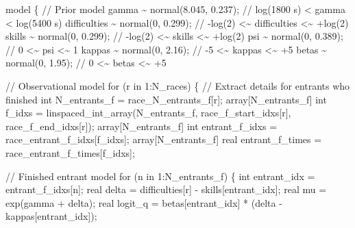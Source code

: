 \documentclass[
  letterpaper,
  DIV=11,
  numbers=noendperiod]{scrartcl}
\newenvironment{Shaded}{\begin{snugshade}}{\end{snugshade}}
\newcommand{\CommentTok}[1]{\textcolor[rgb]{0.37,0.37,0.37}{#1}}
\newcommand{\ControlFlowTok}[1]{\textcolor[rgb]{0.00,0.23,0.31}{#1}}
\newcommand{\DataTypeTok}[1]{\textcolor[rgb]{0.68,0.00,0.00}{#1}}
\newcommand{\DecValTok}[1]{\textcolor[rgb]{0.68,0.00,0.00}{#1}}
\newcommand{\FloatTok}[1]{\textcolor[rgb]{0.68,0.00,0.00}{#1}}
\newcommand{\KeywordTok}[1]{\textcolor[rgb]{0.00,0.23,0.31}{#1}}
\newcommand{\NormalTok}[1]{\textcolor[rgb]{0.00,0.23,0.31}{#1}}
\begin{document}
\begin{codelisting}
\begin{Shaded}
\begin{Highlighting}[]
\KeywordTok{model}\NormalTok{ \{}
  \CommentTok{// Prior model}
\NormalTok{  gamma \textasciitilde{} normal(}\FloatTok{8.045}\NormalTok{, }\FloatTok{0.237}\NormalTok{);    }\CommentTok{// log(1800 s) \textless{} gamma \textless{} log(5400 s)}
\NormalTok{  difficulties \textasciitilde{} normal(}\DecValTok{0}\NormalTok{, }\FloatTok{0.299}\NormalTok{); }\CommentTok{// {-}log(2) \textless{}\textasciitilde{} difficulties \textless{}\textasciitilde{} +log(2)}
\NormalTok{  skills \textasciitilde{} normal(}\DecValTok{0}\NormalTok{, }\FloatTok{0.299}\NormalTok{);       }\CommentTok{// {-}log(2) \textless{}\textasciitilde{}    skills    \textless{}\textasciitilde{} +log(2)}
\NormalTok{  psi \textasciitilde{} normal(}\DecValTok{0}\NormalTok{, }\FloatTok{0.389}\NormalTok{);          }\CommentTok{// 0 \textless{}\textasciitilde{} psi \textless{}\textasciitilde{} 1}
\NormalTok{  kappas \textasciitilde{} normal(}\DecValTok{0}\NormalTok{, }\FloatTok{2.16}\NormalTok{);        }\CommentTok{// {-}5 \textless{}\textasciitilde{} kappas \textless{}\textasciitilde{} +5}
\NormalTok{  betas \textasciitilde{} normal(}\DecValTok{0}\NormalTok{, }\FloatTok{1.95}\NormalTok{);         }\CommentTok{// 0 \textless{}\textasciitilde{} betas \textless{}\textasciitilde{} +5}

  \CommentTok{// Observational model}
  \ControlFlowTok{for}\NormalTok{ (r }\ControlFlowTok{in} \DecValTok{1}\NormalTok{:N\_races) \{}
    \CommentTok{// Extract details for entrants who finished}
    \DataTypeTok{int}\NormalTok{ N\_entrants\_f = race\_N\_entrants\_f[r];}
    \DataTypeTok{array}\NormalTok{[N\_entrants\_f] }\DataTypeTok{int}\NormalTok{ f\_idxs = linspaced\_int\_array(N\_entrants\_f,}
\NormalTok{                                                         race\_f\_start\_idxs[r],}
\NormalTok{                                                         race\_f\_end\_idxs[r]);}
    \DataTypeTok{array}\NormalTok{[N\_entrants\_f] }\DataTypeTok{int}\NormalTok{ entrant\_f\_idxs = race\_entrant\_f\_idxs[f\_idxs];}
    \DataTypeTok{array}\NormalTok{[N\_entrants\_f] }\DataTypeTok{real}\NormalTok{ entrant\_f\_times = race\_entrant\_f\_times[f\_idxs];}

    \CommentTok{// Finished entrant model}
    \ControlFlowTok{for}\NormalTok{ (n }\ControlFlowTok{in} \DecValTok{1}\NormalTok{:N\_entrants\_f) \{}
      \DataTypeTok{int}\NormalTok{ entrant\_idx = entrant\_f\_idxs[n];}
      \DataTypeTok{real}\NormalTok{ delta = difficulties[r] {-} skills[entrant\_idx];}
      \DataTypeTok{real}\NormalTok{ mu = exp(gamma + delta);}
      \DataTypeTok{real}\NormalTok{ logit\_q = betas[entrant\_idx] * (delta {-} kappas[entrant\_idx]);}


\end{Highlighting}
\end{Shaded}
\end{codelisting}
\end{document}
